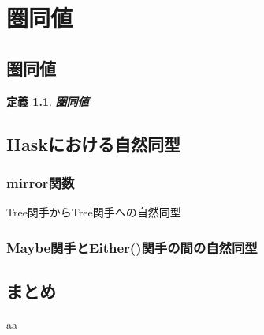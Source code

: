\documentclass[dvipdfmx]{jsbook}
\theoremstyle{plain}
\newtheorem{Def}[thm]{定義}
\begin{document}
\chapter{圏同値}
\section{圏同値}
\begin{Def}
\bf{圏同値}
\end{Def}

\section{Haskにおける自然同型}
\subsection{mirror関数}
Tree関手からTree関手への自然同型
\subsection{Maybe関手とEither()関手の間の自然同型}
\section{まとめ}
aa
\printindex
\end{document}
